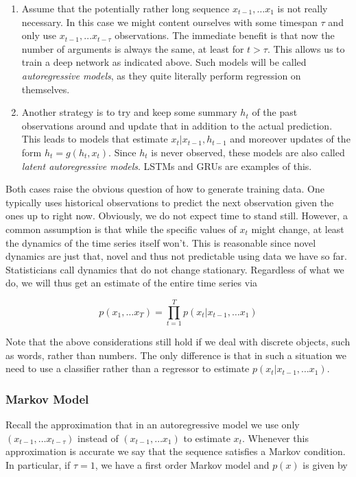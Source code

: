 \begin{enumerate}
    \item Assume that the potentially rather long sequence $x_{t-1}, \ldots x_1$ is not really necessary. In this case we might content ourselves with some timespan $\tau$ and only use $x_{t-1}, \ldots x_{t-\tau}$ observations. The immediate benefit is that now the number of arguments is always the same, at least for $t > \tau$. This allows us to train a deep network as indicated above. Such models will be called \textit{autoregressive models}, as they quite literally perform regression on themselves.
    \item Another strategy is to try and keep some summary $h_t$ of the past observations around and update that in addition to the actual prediction. This leads to models that estimate $x_t|x_{t-1}, h_{t-1}$ and moreover updates of the form $h_t = g(h_t, x_t)$. Since $h_t$ is never observed, these models are also called \textit{latent autoregressive models}. LSTMs and GRUs are examples of this.
\end{enumerate}

Both cases raise the obvious question of how to generate training data. One typically uses historical observations to predict the next observation given the ones up to right now. Obviously, we do not expect time to stand still. However, a common assumption is that while the specific values of $x_t$ might change, at least the dynamics of the time series itself won’t. This is reasonable since novel dynamics are just that, novel and thus not predictable using data we have so far. Statisticians call dynamics that do not change stationary. Regardless of what we do, we will thus get an estimate of the entire time series via

$$p(x_1, \ldots x_T) = \prod_{t=1}^T p(x_t|x_{t-1}, \ldots x_1)$$

Note that the above considerations still hold if we deal with discrete objects, such as words, rather than numbers. The only difference is that in such a situation we need to use a classifier rather than a regressor to estimate $p(x_t| x_{t-1}, \ldots x_1)$.

\subsubsection{Markov Model}

Recall the approximation that in an autoregressive model we use only $(x_{t-1}, \ldots x_{t-\tau})$ instead of $(x_{t-1}, \ldots x_1)$ to estimate $x_t$. Whenever this approximation is accurate we say that the sequence satisfies a Markov condition. In particular, if $\tau = 1$, we have a first order Markov model and $p(x)$ is given by

